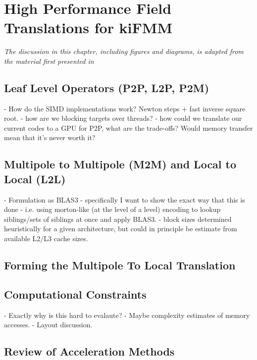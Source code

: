 \chapter{High Performance Field Translations for kiFMM}\label{chpt:field_translation}
\thispagestyle{chaptertitle} %

\begin{center}
    \textit{The discussion in this chapter, including figures and diagrams, is adapted from the material first presented in \cite{kailasa2024m2ltranslationoperatorskernel} }
\end{center}

\section{Leaf Level Operators (P2P, L2P, P2M)}

- How do the SIMD implementations work? Newton steps + fast inverse square root.
- how are we blocking targets over threads?
- how could we translate our current codes to a GPU for P2P, what are the trade-offs? Would memory transfer mean that it's never worth it?

\section{Multipole to Multipole (M2M) and Local to Local (L2L)}

- Formulation as BLAS3
    - specifically I want to show the exact way that this is done
    - i.e. using morton-like (at the level of a level) encoding to lookup siblings/sets of siblings at once and apply BLAS3.
    - block sizes determined heuristically for a given architecture, but could in principle be estimate from available L2/L3 cache sizes.


\section{Forming the Multipole To Local Translation}

\section{Computational Constraints}

- Exactly why is this hard to evalaute?
- Maybe complexity estimates of memory accesses.
- Layout discussion.


\section{Review of Acceleration Methods}

